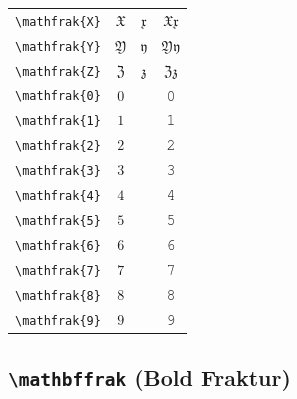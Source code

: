 \documentclass[12pt,a4paper]{article}
\begin{document}
\begin{longtable}{|c|c|c|c|}
\verb|\mathfrak{X}| & $\mathfrak{X}$ & $\mathfrak{x}$ & $ 𝔛 𝔵 $ \\
\verb|\mathfrak{Y}| & $\mathfrak{Y}$ & $\mathfrak{y}$ & $ 𝔜 𝔶 $ \\
\verb|\mathfrak{Z}| & $\mathfrak{Z}$ & $\mathfrak{z}$ & $ ℨ 𝔷 $ \\
\verb|\mathfrak{0}| & $\mathfrak{0}$ & & 𝟶 \\
\verb|\mathfrak{1}| & $\mathfrak{1}$ & & 𝟷 \\
\verb|\mathfrak{2}| & $\mathfrak{2}$ & & 𝟸 \\
\verb|\mathfrak{3}| & $\mathfrak{3}$ & & 𝟹 \\
\verb|\mathfrak{4}| & $\mathfrak{4}$ & & 𝟺 \\
\verb|\mathfrak{5}| & $\mathfrak{5}$ & & 𝟻 \\
\verb|\mathfrak{6}| & $\mathfrak{6}$ & & 𝟼 \\
\verb|\mathfrak{7}| & $\mathfrak{7}$ & & 𝟽 \\
\verb|\mathfrak{8}| & $\mathfrak{8}$ & & 𝟾 \\
\verb|\mathfrak{9}| & $\mathfrak{9}$ & & 𝟿 \\
\hline
\end{longtable}

\newpage

\subsection*{\texttt{\textbackslash{}mathbffrak} (Bold Fraktur)}
\end{document}
